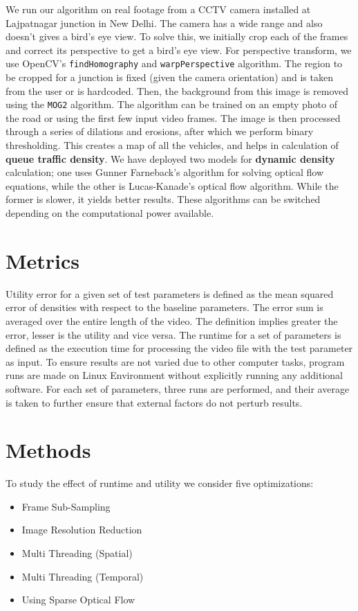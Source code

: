 \documentclass[conference]{IEEEtran}
\begin{document}
We run our algorithm on real footage from a CCTV camera installed at Lajpatnagar junction in New Delhi. \cite{b1}
The camera has a wide range and also doesn't gives a bird's eye view. To solve this, we initially crop each of the frames and correct its perspective to get a bird's eye view. 
For perspective transform, we use OpenCV's \verb|findHomography| and \verb|warpPerspective| algorithm. \cite{b2}
The region to be cropped for a junction is fixed (given the camera orientation) and is taken from the user or is hardcoded.
Then, the background from this image is removed using the \verb|MOG2| algorithm. The algorithm can be trained on an empty photo of the road or using the first few input video frames.
The image is then processed through a series of dilations and erosions, after which we perform binary thresholding. This creates a map of all the vehicles, and helps in calculation of {\bfseries{queue traffic density}}. 
We have deployed two models for \textbf{dynamic density} calculation; one uses Gunner Farneback's algorithm \cite{b4} for solving optical flow equations, while the other is Lucas-Kanade's optical flow algorithm. \cite{b5}
While the former is slower, it yields better results. These algorithms can be switched depending on the computational power available.

\section{Metrics}

Utility error for a given set of test parameters is defined as the mean squared error of densities with respect to the baseline parameters. The error sum is averaged over the entire length of the video. The definition implies greater the error, lesser is the utility and vice versa.
The runtime for a set of parameters is defined as the execution time for processing the video file with the test parameter as input. To ensure results are not varied due to other computer tasks, 
program runs are made on Linux Environment without explicitly running any additional software. For each set of parameters, three runs are performed, and their average is taken to further ensure that external factors do not perturb results.
\section{Methods}

To study the effect of runtime and utility we consider five optimizations:
\begin{itemize}
    \item Frame Sub-Sampling
    \item Image Resolution Reduction
    \item Multi Threading (Spatial)
    \item Multi Threading (Temporal)
    \item Using Sparse Optical Flow
\end{itemize}
\end{document}
